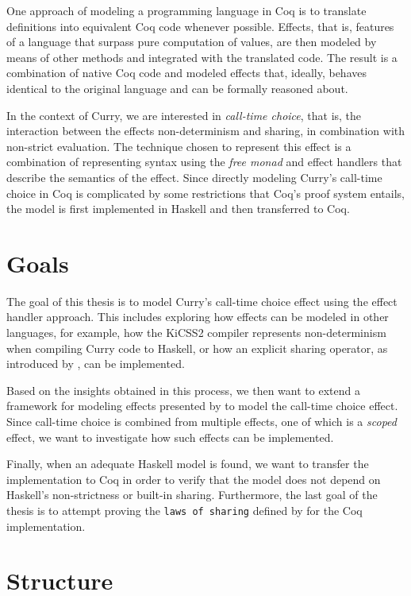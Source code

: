\documentclass[a4paper, 11pt, fleqn, twoside]{scrreprt}
\begin{document}
One approach of modeling a programming language in Coq is to translate definitions into equivalent Coq code whenever possible.
Effects, that is, features of a language that surpass pure computation of values, are then modeled by means of other methods and integrated with the translated code.
The result is a combination of native Coq code and modeled effects that, ideally, behaves identical to the original language and can be formally reasoned about.

In the context of Curry, we are interested in \textit{call-time choice}, that is, the interaction between the effects non-determinism and sharing, in combination with non-strict evaluation.
The technique chosen to represent this effect is a combination of representing syntax using the \textit{free monad} and effect handlers that describe the semantics of the effect.
Since directly modeling Curry's call-time choice in Coq is complicated by some restrictions that Coq's proof system entails, the model is first implemented in Haskell and then transferred to Coq.

\section{Goals}

The goal of this thesis is to model Curry's call-time choice effect using the effect handler approach.
This includes exploring how effects can be modeled in other languages, for example, how the KiCSS2 compiler represents non-determinism when compiling Curry code to Haskell, or how an explicit sharing operator, as introduced by \citet{fischer2009purely}, can be implemented.

Based on the insights obtained in this process, we then want to extend a framework for modeling effects presented by \citet{wu2014effect} to model the call-time choice effect.
Since call-time choice is combined from multiple effects, one of which is a \textit{scoped} effect, we want to investigate how such effects can be implemented.

Finally, when an adequate Haskell model is found, we want to transfer the implementation to Coq in order to verify that the model does not depend on Haskell's non-strictness or built-in sharing.
Furthermore, the last goal of the thesis is to attempt proving the \texttt{laws of sharing} defined by \citet{fischer2009purely} for the Coq implementation.

\section{Structure}
\end{document}
